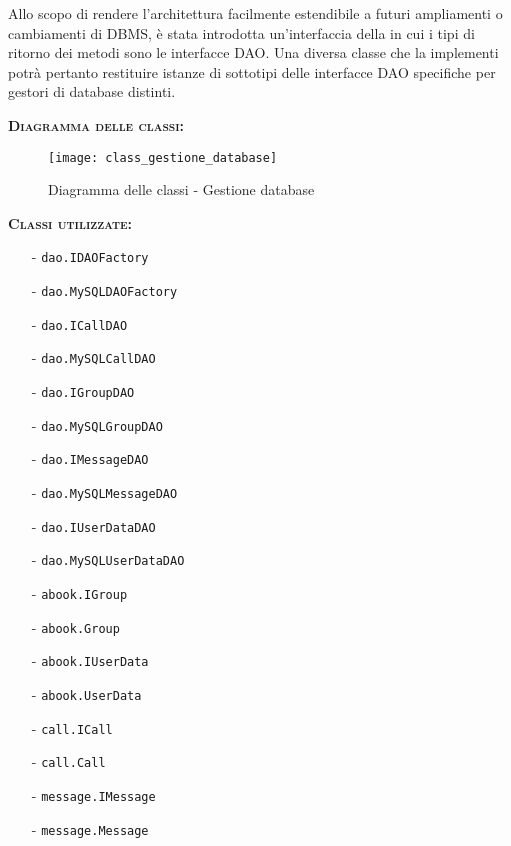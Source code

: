 \begin{description}
Allo scopo di rendere l'architettura facilmente estendibile a futuri ampliamenti o cambiamenti di DBMS, è stata introdotta un'interfaccia della  in cui i tipi di ritorno dei metodi sono le interfacce DAO\@. Una diversa classe  che la implementi potrà pertanto restituire istanze di sottotipi delle interfacce DAO specifiche per gestori di database distinti.

\item{\scshape\bfseries Diagramma delle classi:}
\begin{figure}[H]
  \centering
  \texttt{[image: class\_gestione\_database]}
  \caption{Diagramma delle classi - Gestione database}\label{fig:gestione_database}
\end{figure}

	\item{\scshape\bfseries Classi utilizzate:}
	\begin{itemize}[nolistsep, noitemsep]
	  \item[-] \texttt{dao.IDAOFactory}
	  \item[-] \texttt{dao.MySQLDAOFactory}
	  \item[-] \texttt{dao.ICallDAO}
	  \item[-] \texttt{dao.MySQLCallDAO}
	  \item[-] \texttt{dao.IGroupDAO}
	  \item[-] \texttt{dao.MySQLGroupDAO}
	  \item[-] \texttt{dao.IMessageDAO}
	  \item[-] \texttt{dao.MySQLMessageDAO}
	  \item[-] \texttt{dao.IUserDataDAO}
	  \item[-] \texttt{dao.MySQLUserDataDAO}
	  \item[-] \texttt{abook.IGroup}
	  \item[-] \texttt{abook.Group}
	  \item[-] \texttt{abook.IUserData}
	  \item[-] \texttt{abook.UserData}
	  \item[-] \texttt{call.ICall}
	  \item[-] \texttt{call.Call}
	  \item[-] \texttt{message.IMessage}
	  \item[-] \texttt{message.Message}
	\end{itemize}
\end{description}

